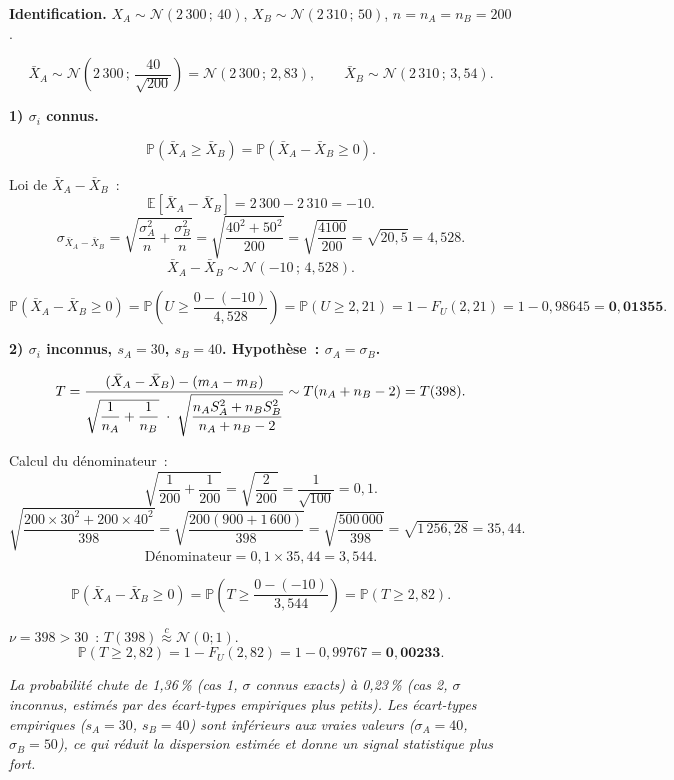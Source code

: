\documentclass[11pt,a4paper]{article}
\newcommand{\N}{\mathcal{N}}
\newcommand{\E}{\mathbb{E}}
\newcommand{\Prob}{\mathbb{P}}
\newcommand{\appN}{\overset{c}{\approx}}
\renewcommand{\P}{\Prob}
\newcommand{\corrsep}{\vspace{4pt}{\color{rulecol}\hrule height 0.6pt}\vspace{6pt}}
\begin{document}
\corrsep

\textbf{Identification.} $X_A\sim\N(2\,300\,;\,40)$, $X_B\sim\N(2\,310\,;\,50)$, $n=n_A=n_B=200$.

$$\bar{X}_A\sim\N\!\left(2\,300\,;\,\frac{40}{\sqrt{200}}\right)=\N(2\,300\,;\,2{,}83),\qquad
  \bar{X}_B\sim\N(2\,310\,;\,3{,}54).$$

\textbf{1) $\sigma_i$ connus.}

$$\P(\bar{X}_A\geq\bar{X}_B) = \P(\bar{X}_A-\bar{X}_B\geq0).$$

Loi de $\bar{X}_A-\bar{X}_B$~:
$$\E[\bar{X}_A-\bar{X}_B] = 2\,300-2\,310 = -10.$$
$$\sigma_{\bar{X}_A-\bar{X}_B} = \sqrt{\frac{\sigma_A^2}{n}+\frac{\sigma_B^2}{n}}
  = \sqrt{\frac{40^2+50^2}{200}} = \sqrt{\frac{4100}{200}} = \sqrt{20{,}5} = 4{,}528.$$
$$\bar{X}_A-\bar{X}_B\sim\N(-10\,;\,4{,}528).$$

$$\P(\bar{X}_A-\bar{X}_B\geq 0) = \P\!\left(U\geq\frac{0-(-10)}{4{,}528}\right)
  = \P(U\geq 2{,}21) = 1-F_U(2{,}21) = 1-0{,}98645 = \mathbf{0{,}01355}.$$

\textbf{2) $\sigma_i$ inconnus, $s_A=30$, $s_B=40$. Hypoth\`ese~: $\sigma_A=\sigma_B$.}

$$T = \frac{(\bar{X}_A-\bar{X}_B)-(m_A-m_B)}{%
  \sqrt{\dfrac{1}{n_A}+\dfrac{1}{n_B}}\;\cdot\;
  \sqrt{\dfrac{n_AS_A^2+n_BS_B^2}{n_A+n_B-2}}} \sim T(n_A+n_B-2)=T(398).$$

Calcul du d\'enominateur~:
$$\sqrt{\frac{1}{200}+\frac{1}{200}} = \sqrt{\frac{2}{200}} = \frac{1}{\sqrt{100}} = 0{,}1.$$
$$\sqrt{\frac{200\times30^2+200\times40^2}{398}} = \sqrt{\frac{200(900+1\,600)}{398}}
  = \sqrt{\frac{500\,000}{398}} = \sqrt{1\,256{,}28} = 35{,}44.$$
$$\text{D\'enominateur} = 0{,}1\times 35{,}44 = 3{,}544.$$

$$\P(\bar{X}_A-\bar{X}_B\geq0) = \P\!\left(T\geq\frac{0-(-10)}{3{,}544}\right)
  = \P(T\geq2{,}82).$$

\begin{methbox}[Convergence]
$\nu=398>30$~: $T(398)\appN\N(0;1)$.
$$\P(T\geq2{,}82) = 1-F_U(2{,}82) = 1-0{,}99767 = \mathbf{0{,}00233}.$$
\end{methbox}

\textit{La probabilit\'e chute de 1,36\,\% (cas 1, $\sigma$ connus exacts) \`a 0,23\,\% (cas 2, $\sigma$ inconnus, estim\'es par des \'ecart-types empiriques plus petits). Les \'ecart-types empiriques ($s_A=30$, $s_B=40$) sont inf\'erieurs aux vraies valeurs ($\sigma_A=40$, $\sigma_B=50$), ce qui r\'eduit la dispersion estim\'ee et donne un signal statistique plus fort.}
\end{document}
